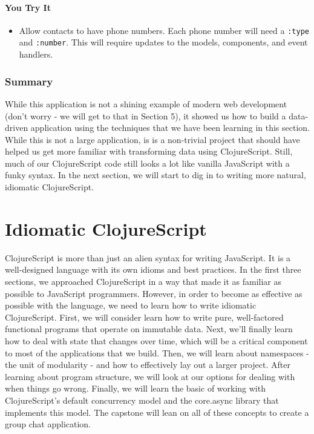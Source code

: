 \documentclass[10pt,twoside,openright]{memoir}
\begin{document}
\subsection{You Try It}

\begin{itemize}
\tightlist
\item
  Allow contacts to have phone numbers. Each phone number will need a
  \texttt{:type} and \texttt{:number}. This will require updates to the
  models, components, and event handlers.
\end{itemize}


\section{Summary}

While this application is not a shining example of modern web
development (don't worry - we will get to that in Section 5), it showed
us how to build a data-driven application using the techniques that we
have been learning in this section. While this is not a large
application, is is a non-trivial project that should have helped us get
more familiar with transforming data using ClojureScript. Still, much of
our ClojureScript code still looks a lot like vanilla JavaScript with a
funky syntax. In the next section, we will start to dig in to writing
more natural, idiomatic ClojureScript.

\cleardoublepage
{\let\newpage\relax\part{Idiomatic
ClojureScript}}

ClojureScript is more than just an alien syntax for writing JavaScript.
It is a well-designed language with its own idioms and best practices.
In the first three sections, we approached ClojureScript in a way that
made it as familiar as possible to JavaScript programmers. However, in
order to become as effective as possible with the language, we need to
learn how to write idiomatic ClojureScript. First, we will consider
learn how to write pure, well-factored functional programs that operate
on immutable data. Next, we'll finally learn how to deal with state that
changes over time, which will be a critical component to most of the
applications that we build. Then, we will learn about namespaces - the
unit of modularity - and how to effectively lay out a larger project.
After learning about program structure, we will look at our options for
dealing with when things go wrong. Finally, we will learn the basic of
working with ClojureScript's default concurrency model and the
core.async library that implements this model. The capstone will lean on
all of these concepts to create a group chat application.
\end{document}
